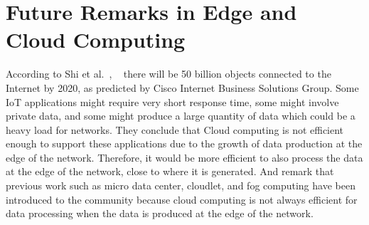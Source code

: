 \section{Future Remarks in Edge and Cloud Computing}

According to Shi et al.~\cite{vision_challenges_edge}, ~\cite{promise_edge} there will be 50 billion objects connected to the Internet by 2020, as predicted by Cisco Internet Business Solutions Group. Some IoT applications might require very short response time, some might involve private data, and some might produce a large quantity of data which could be a heavy load for networks. They conclude that Cloud computing is not efficient enough to support these applications due to the growth of data production at the edge of the network. Therefore, it would be more efficient to also process the data at the edge of the network, close to where it is generated.
And remark that previous work such as micro data center, cloudlet, and fog computing have been introduced to the community because cloud computing is not always efficient for data processing when the data is produced at the edge of the network.

